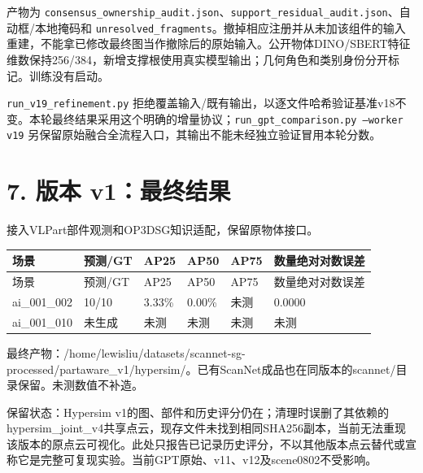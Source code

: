 \documentclass[UTF8,fontset=fandol]{ctexart}
\begin{document}
产物为 \texttt{consensus\_\allowbreak{}ownership\_\allowbreak{}audit.\allowbreak{}json}、\texttt{support\_\allowbreak{}residual\_\allowbreak{}audit.\allowbreak{}json}、自动框/本地掩码和 \texttt{unresolved\_\allowbreak{}fragments}。撤掉相应注册并从未加该组件的输入重建，不能拿已修改最终图当作撤除后的原始输入。公开物体DINO/SBERT特征维数保持256/384，新增支撑根使用真实模型输出；几何角色和类别身份分开标记。训练没有启动。



\texttt{run\_\allowbreak{}v19\_\allowbreak{}refinement.\allowbreak{}py} 拒绝覆盖输入/既有输出，以逐文件哈希验证基准v18不变。本轮最终结果采用这个明确的增量协议；\texttt{run\_\allowbreak{}gpt\_\allowbreak{}comparison.\allowbreak{}py --worker v19} 另保留原始融合全流程入口，其输出不能未经独立验证冒用本轮分数。



\section*{7. 版本 v1：最终结果}

接入VLPart部件观测和OP3DSG知识适配，保留原物体接口。



{\small
\begin{longtable}{|p{}|p{}|p{}|p{}|p{}|p{}|}
\hline
场景 & 预测/GT & AP25 & AP50 & AP75 & 数量绝对对数误差 \\ \hline
\endfirsthead
\hline
场景 & 预测/GT & AP25 & AP50 & AP75 & 数量绝对对数误差 \\ \hline
\endhead
ai\_001\_002 & 10/10 & 3.33\% & 0.00\% & 未测 & 0.0000 \\ \hline
ai\_001\_010 & 未生成 & 未测 & 未测 & 未测 & 未测 \\ \hline
\end{longtable}
}

最终产物：/home/lewisliu/datasets/scannet-sg-processed/partaware\_v1/hypersim/。已有ScanNet成品也在同版本的scannet/目录保留。未测数值不补造。



保留状态：Hypersim v1的图、部件和历史评分仍在；清理时误删了其依赖的hypersim\_joint\_v4共享点云，现存文件未找到相同SHA256副本，当前无法重现该版本的原点云可视化。此处只报告已记录历史评分，不以其他版本点云替代或宣称它是完整可复现实验。当前GPT原始、v11、v12及scene0802不受影响。
\end{document}
